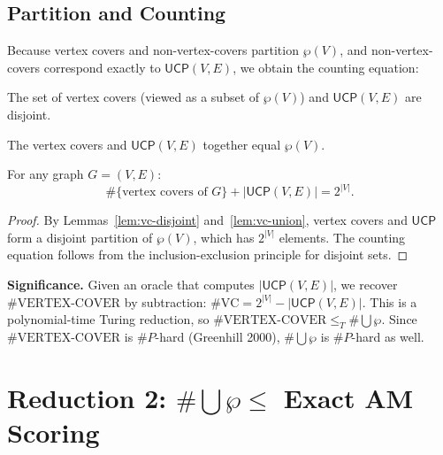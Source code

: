 \section{Partition and Counting}

Because vertex covers and non-vertex-covers partition $\wp(V)$, and
non-vertex-covers correspond exactly to $\mathsf{UCP}(V, E)$, we obtain the
counting equation:

\begin{lemma}[Disjointness]
  \label{lem:vc-disjoint}
  \leanok
  The set of vertex covers (viewed as a subset of $\wp(V)$) and
  $\mathsf{UCP}(V, E)$ are disjoint.
\end{lemma}

\begin{lemma}
  \label{lem:vc-union}
  \leanok
  The vertex covers and $\mathsf{UCP}(V, E)$ together equal $\wp(V)$.
\end{lemma}

\begin{theorem}
  \label{thm:counting-equation-vc}
  \leanok
  For any graph $G = (V, E)$:
  \[
    \#\{\text{vertex covers of }G\} + |\mathsf{UCP}(V, E)| = 2^{|V|}.
  \]

  \begin{proof}
    By Lemmas~\ref{lem:vc-disjoint} and~\ref{lem:vc-union}, vertex covers and
    $\mathsf{UCP}$ form a disjoint partition of $\wp(V)$, which has $2^{|V|}$
    elements.  The counting equation follows from the inclusion-exclusion
    principle for disjoint sets.
  \end{proof}

  \textbf{Significance.}  Given an oracle that computes
  $|\mathsf{UCP}(V, E)|$, we recover $\#\text{VERTEX-COVER}$ by subtraction:
  $\#\text{VC} = 2^{|V|} - |\mathsf{UCP}(V, E)|$.  This is a polynomial-time
  Turing reduction, so $\#\text{VERTEX-COVER} \leq_T \#\bigcup\wp$.  Since
  $\#\text{VERTEX-COVER}$ is $\#P$-hard (Greenhill 2000), $\#\bigcup\wp$ is
  $\#P$-hard as well.
\end{theorem}

\chapter{Reduction 2: \texorpdfstring{$\#\bigcup\wp \leq$ Exact AM Scoring}{\#UnionPowersets <= Exact AM Scoring}}

